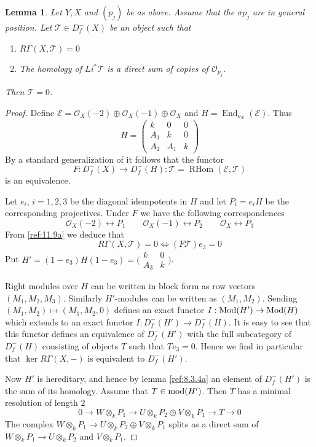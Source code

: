\documentclass{amsproc}
\def\Escr{{\mathcal E}}
\def\Oscr{{\mathcal O}}
\def\Tscr{{\mathcal T}}
\def\Mod{\mathop{\text{Mod}}}
\def\mod{\mathop{\text{mod}}}
\def\RHom{\operatorname {RHom}}
\def\ker{\operatorname {ker}}
\def\End{\operatorname {End}}
\def\r{\rightarrow}
\let\oldtext\text
\def\text#1{\oldtext{\upshape #1}}
\newtheorem{lemmas}{Lemma}[subsection]
\theoremstyle{definition}
\theoremstyle{remark}
\numberwithin{equation}{section}
\numberwithin{table}{section}
\numberwithin{figure}{section}
\begin{document}
\begin{lemmas}
\label{ref:11.1.4a} Let $Y,X$ and $(p_{j})$ be as above. Assume  that the
$\sigma p_{j}$ are in general position. Let 
$\Tscr\in D_f^-(X)$ 
be an object such that
\begin{enumerate}
\item
 $R\Gamma(X,\Tscr)=0$
\item
The homology of $Li^\ast\Tscr$ is a direct sum of copies of
$\Oscr_{p_{j}}$.  
\end{enumerate}
Then $\Tscr=0$.
\end{lemmas}
\begin{proof}


Define  $\Escr=\Oscr_X(-2)\oplus \Oscr_X(-1)\oplus \Oscr_X$ and 
$H=\End_{o_X}(\Escr)$. Thus
\[
H=\begin{pmatrix}
k& 0 & 0\\
A_1 & k & 0\\
A_2 & A_1 & k
\end{pmatrix}
\]
By a  standard generalization of  \cite{Beilinson} it follows that
the functor 
\begin{equation}
\label{ref:11.9a}
F:D^-_f(X)\r D^-_f(H): \Tscr=\RHom(\Escr,\Tscr)
\end{equation}
is an equivalence.

Let $e_i$, $i=1,2,3$ be the diagonal idempotents in $H$ and let $P_i=e_iH$
be the corresponding projectives. Under $F$ we have the following
correspondences
\[
\Oscr_X(-2)\leftrightarrow P_1\qquad  \Oscr_X(-1)\leftrightarrow P_2
\qquad \Oscr_X\leftrightarrow P_3
\]
From  \eqref{ref:11.9a} we deduce that 
\[
R\Gamma(X,\Tscr)=0\iff (F\Tscr)e_3=0
\]
Put $H'=(1-e_3)H(1-e_3)=\bigl(\begin{smallmatrix} k&0\\ A_3 &
  k\end{smallmatrix} \bigr)$.

Right modules over $H$ can be written in block form as row vectors $(M_1,
M_2, M_3)$. Similarly $H'$-modules can be written as
$(M_1,M_2)$. Sending 
$(M_1,M_2)\mapsto (M_1,M_2,0)$ defines an exact
functor $I:\Mod(H')\r \Mod(H)$ which extends to an exact functor
$I:D^-_f(H')\r D^-_f(H)$. It is easy to see that this functor defines an
equivalence of $D^-_f(H')$ with the full subcategory of $D^-_f(H)$
consisting of objects $T$ such that $Te_3=0$.
Hence we find in particular that 
$\ker R\Gamma(X,-)$ is equivalent to $ D^-_f(H')$.

Now $H'$ is hereditary, and hence by lemma
\ref{ref:8.3.4a} an element of $D^-_f(H')$ is the sum of its
homology.
Assume that $T\in\mod(H')$. Then $T$ has a minimal resolution of length
$2$
\[
0\r W\otimes_k P_1\r U\otimes_k P_2 \oplus V\otimes_k P_1 \r T\r 0
\]
The complex $W\otimes_k P_1\r U\otimes_k P_2 \oplus V\otimes_k P_1$
splits as a direct sum of $W\otimes_k P_1\r U\otimes_k P_2$ and
$V\otimes_k P_1$.


\end{proof}
\end{document}
